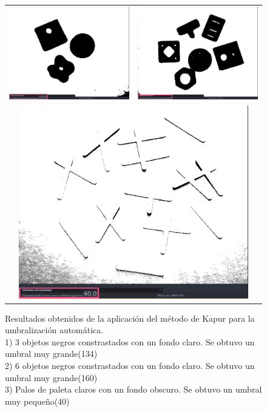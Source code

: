 	\begin{figure}[!h]
		\begin{tabular}{cc}
			\includegraphics[width=9.5cm]{Imagenes/Kapur_1.png} & \includegraphics[width=9.5cm]{Imagenes/Kapur_2.png} \\
			\multicolumn{2}{c}{\includegraphics[width=10cm]{Imagenes/Kapur_3.png}}
		\end{tabular}
		\label{Kapur}
		\caption{Resultados obtenidos de la aplicación del método de Kapur para la umbralización automática. \\ 1) 3 objetos negros constrastados con un fondo claro. Se obtuvo un umbral muy grande(134) \\ 2) 6 objetos negros constrastados con un fondo claro. Se obtuvo un umbral muy grande(160) \\ 3) Palos de paleta claros con un fondo obscuro. Se obtuvo un umbral muy pequeño(40)}
	\end{figure}
	
